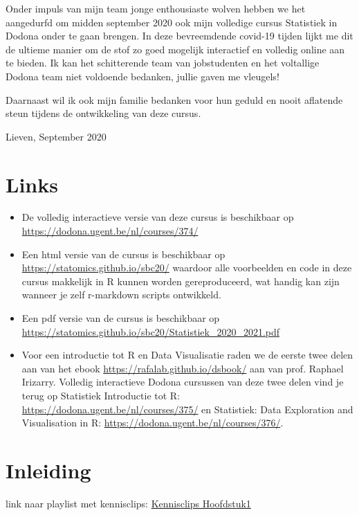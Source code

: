 \documentclass[
  12pt,dutch,coursenotes]{book}
\theoremstyle{definition}
\theoremstyle{definition}
\theoremstyle{definition}
\theoremstyle{remark}
\begin{document}
Onder impuls van mijn team jonge enthousiaste wolven hebben we het aangedurfd om midden september 2020 ook mijn volledige cursus Statistiek in Dodona onder te gaan brengen. In deze bevreemdende covid-19 tijden lijkt me dit de ultieme manier om de stof zo goed mogelijk interactief en volledig online aan te bieden.
Ik kan het schitterende team van jobstudenten en het voltallige Dodona team niet voldoende bedanken, jullie gaven me vleugels!

Daarnaast wil ik ook mijn familie bedanken voor hun geduld en nooit aflatende steun tijdens de ontwikkeling van deze cursus.

Lieven, September 2020

\hypertarget{links}{%
\chapter*{Links}\label{links}}

\begin{itemize}
\item
  De volledig interactieve versie van deze cursus is beschikbaar op \url{https://dodona.ugent.be/nl/courses/374/}
\item
  Een html versie van de cursus is beschikbaar op \url{https://statomics.github.io/sbc20/} waardoor alle voorbeelden en code in deze cursus makkelijk in R kunnen worden gereproduceerd, wat handig kan zijn wanneer je zelf r-markdown scripts ontwikkeld.
\item
  Een pdf versie van de cursus is beschikbaar op \url{https://statomics.github.io/sbc20/Statistiek_2020_2021.pdf}
\item
  Voor een introductie tot R en Data Visualisatie raden we de eerste twee delen aan van het ebook \url{https://rafalab.github.io/dsbook/} aan van prof. Raphael Irizarry. Volledig interactieve Dodona cursussen van deze twee delen vind je terug op Statistiek Introductie tot R: \url{https://dodona.ugent.be/nl/courses/375/} en Statistiek: Data Exploration and Visualisation in R: \url{https://dodona.ugent.be/nl/courses/376/}.
\end{itemize}

\hypertarget{inleiding}{%
\chapter{Inleiding}\label{inleiding}}

link naar playlist met kennisclips:
\href{https://www.youtube.com/playlist?list=PLZH1hP8_LbJIk4G2AZYYKvgZLjRR-1-Iw}{Kennisclips Hoofdstuk1}
\end{document}
